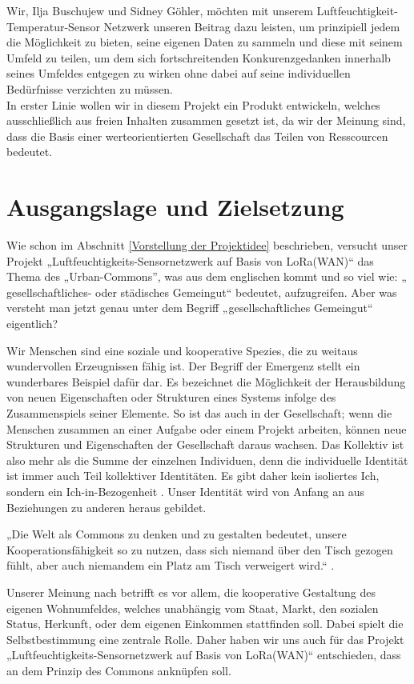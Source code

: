 Wir, Ilja Buschujew und Sidney Göhler, möchten mit unserem Luftfeuchtigkeit-Temperatur-Sensor Netzwerk unseren Beitrag dazu leisten, um prinzipiell jedem die Möglichkeit zu bieten, seine eigenen Daten zu sammeln und diese mit seinem Umfeld zu teilen, um dem sich fortschreitenden Konkurenzgedanken innerhalb seines Umfeldes entgegen zu wirken ohne dabei auf seine individuellen Bedürfnisse verzichten zu müssen.\\
In erster Linie wollen wir in diesem Projekt ein Produkt entwickeln, welches ausschließlich aus freien Inhalten zusammen gesetzt ist, da wir der Meinung sind, dass die Basis einer werteorientierten Gesellschaft das Teilen von Resscourcen bedeutet.


\section{Ausgangslage und Zielsetzung} \label{Ausgangslage und Zielsetzung}

Wie schon im Abschnitt \ref{Vorstellung der Projektidee} beschrieben, versucht unser Projekt „Luftfeuchtigkeits-Sensornetzwerk auf Basis von LoRa(WAN)“ das Thema des „Urban-Commons”, was aus dem englischen kommt und so viel wie: „ gesellschaftliches- oder städisches Gemeingut“ bedeutet, aufzugreifen. Aber was versteht man jetzt genau unter dem Begriff „gesellschaftliches Gemeingut“ eigentlich?  

Wir Menschen sind eine soziale und kooperative Spezies, die zu weitaus wundervollen Erzeugnissen fähig ist. Der Begriff der Emergenz stellt ein wunderbares Beispiel dafür dar. Es bezeichnet die Möglichkeit der Herausbildung von neuen Eigenschaften oder Strukturen eines Systems infolge des Zusammenspiels seiner Elemente. So ist das auch in der Gesellschaft; wenn die Menschen zusammen an einer Aufgabe oder einem Projekt arbeiten, können neue Strukturen und Eigenschaften der Gesellschaft daraus wachsen. Das Kollektiv ist also mehr als die Summe der einzelnen Individuen, denn die individuelle Identität ist immer auch Teil kollektiver Identitäten. Es gibt daher kein isoliertes Ich, sondern ein Ich-in-Bezogenheit \cite{Bollier2019}. Unser Identität wird von Anfang an aus Beziehungen zu anderen heraus gebildet.  

„Die Welt als Commons zu denken und zu gestalten bedeutet, unsere Kooperationsfähigkeit so zu nutzen, dass sich niemand über den Tisch gezogen fühlt, aber auch niemandem ein Platz am Tisch verweigert wird.“ \cite{Bollier2019}. 

Unserer Meinung nach betrifft es vor allem, die kooperative Gestaltung des eigenen Wohnumfeldes, welches unabhängig vom Staat, Markt, den sozialen Status, Herkunft, oder dem eigenen Einkommen stattfinden soll. Dabei spielt die Selbstbestimmung eine zentrale Rolle. Daher haben wir uns auch für das Projekt „Luftfeuchtigkeits-Sensornetzwerk auf Basis von LoRa(WAN)“ entschieden, dass an dem Prinzip des Commons anknüpfen soll.  

